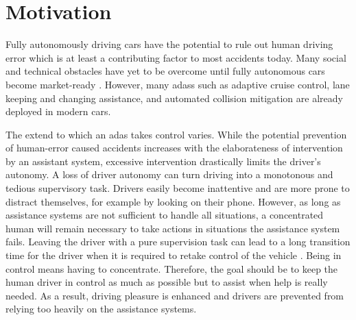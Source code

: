 \fi

%
%

\section{Motivation}

Fully autonomously driving cars have the potential to rule out human driving error which is at least a contributing factor to most accidents today. Many social and technical obstacles have yet to be overcome until fully autonomous cars become market-ready \parencite{autonomous_driving_book}. However, many \glspl{adas} such as adaptive cruise control, lane keeping and changing assistance, and automated collision mitigation are already deployed in modern cars. 

The extend to which an \gls{adas} takes control varies. While the potential prevention of human-error caused accidents increases with the elaborateness of intervention by an assistant system, excessive intervention drastically limits the driver's autonomy. A loss of driver autonomy can turn driving into a monotonous and tedious supervisory task. Drivers easily become inattentive and are more prone to distract themselves, for example by looking on their phone. However, as long as assistance systems are not sufficient to handle all situations, a concentrated human will remain necessary to take actions in situations the assistance system fails. Leaving the driver with a pure supervision task can lead to a long transition time for the driver when it is required to retake control of the vehicle \parencite{shared_control}. Being in control means having to concentrate. Therefore, the goal should be to keep the human driver in control as much as possible but to assist when help is really needed. As a result, driving pleasure is enhanced and drivers are prevented from relying too heavily on the assistance systems.



